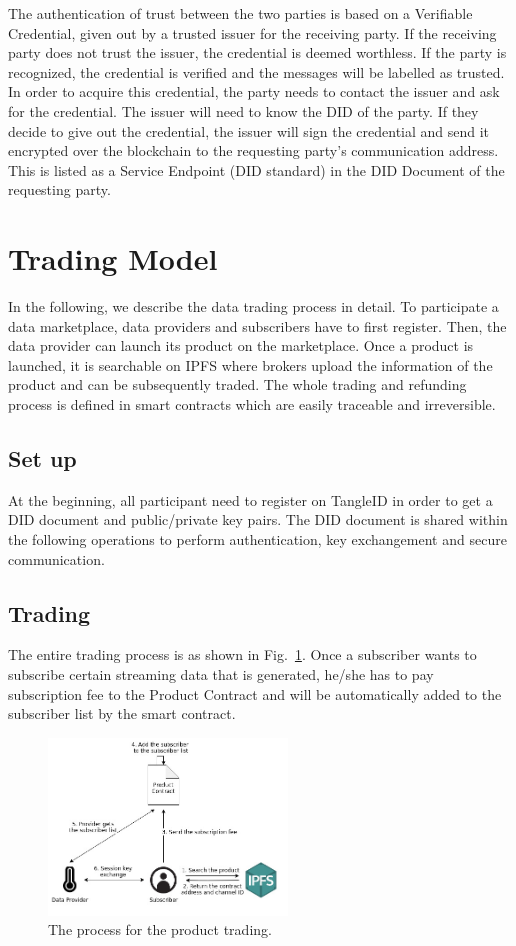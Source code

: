 \documentclass[conference]{IEEEtran}
\begin{document}
The authentication of trust between the two parties is based on a Verifiable Credential, given out by a trusted issuer for the receiving party. If the receiving party does not trust the issuer, the credential is deemed worthless. If the party is recognized, the credential is verified and the messages will be labelled as trusted. In order to acquire this credential, the party needs to contact the issuer and ask for the credential. The issuer will need to know the DID of the party. If they decide to give out the credential, the issuer will sign the credential and send it encrypted over the blockchain to the requesting party's communication address. This is listed as a Service Endpoint (DID standard) in the DID Document of the requesting party.

\section{Trading Model}
In the following, we describe the data trading process in detail. To participate a data marketplace, data providers and subscribers have to first register. Then,  the data provider can launch its product on the marketplace. Once a product is launched, it is searchable on IPFS where brokers upload the information of the product and can be subsequently traded. The whole trading and refunding process is defined in smart contracts which are easily traceable and irreversible.

\subsection{Set up}
At the beginning, all participant need to register on TangleID in order to get a DID document and public/private key pairs. The DID document is shared within the following operations to perform authentication, key exchangement and secure communication. 

\subsection{Trading}
\label{section:trading}

The entire trading process is as shown in Fig.~\ref{fig:trading_product}. Once a subscriber wants to subscribe certain streaming data that is generated, he/she has to pay subscription fee to the Product Contract and will be automatically added to the subscriber list by the smart contract.

\begin{figure}[!t]
    \centering
    \includegraphics[width=2.5in]{trading_product}
    \caption{The process for the product trading.}
    \label{fig:trading_product}
\end{figure}
\end{document}

